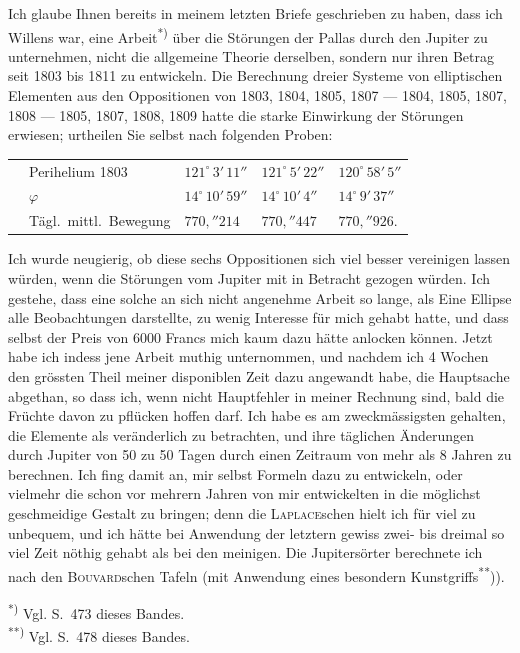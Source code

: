 \documentclass[12pt,a4paper]{article}
\begin{document}
Ich glaube Ihnen bereits in meinem letzten Briefe geschrieben zu haben, dass ich Willens war, eine Arbeit\textsuperscript{*)} über die Störungen der Pallas durch den Jupiter zu unternehmen, nicht die allgemeine Theorie derselben, sondern nur ihren Betrag seit 1803 bis 1811 zu entwickeln. Die Berechnung dreier Systeme von elliptischen Elementen aus den Oppositionen von 1803, 1804, 1805, 1807 --- 1804, 1805, 1807, 1808 --- 1805, 1807, 1808, 1809 hatte die starke Einwirkung der Störungen erwiesen; urtheilen Sie selbst nach folgenden Proben:
\begin{center}
\begin{tabular}{l@{\quad}l@{\quad}l@{\quad}l}
\toprule
& Perihelium 1803 & $121^\circ\,3'\,11''$ & $121^\circ\,5'\,22''$ & $120^\circ\,58'\,5''$ \\
& $\varphi$ & $14^\circ\,10'\,59''$ & $14^\circ\,10'\,4''$ & $14^\circ\,9'\,37''$ \\
& Tägl.~mittl.~Bewegung & $770{,}''214$ & $770{,}''447$ & $770{,}''926$. \\
\bottomrule
\end{tabular}
\end{center}
Ich wurde neugierig, ob diese sechs Oppositionen sich viel besser vereinigen lassen würden, wenn die Störungen vom Jupiter mit in Betracht gezogen würden. Ich gestehe, dass eine solche an sich nicht angenehme Arbeit so lange, als Eine Ellipse alle Beobachtungen darstellte, zu wenig Interesse für mich gehabt hatte, und dass selbst der Preis von 6000 Francs mich kaum dazu hätte anlocken können. Jetzt habe ich indess jene Arbeit muthig unternommen, und nachdem ich 4 Wochen den grössten Theil meiner disponiblen Zeit dazu angewandt habe, die Hauptsache abgethan, so dass ich, wenn nicht Hauptfehler in meiner Rechnung sind, bald die Früchte davon zu pflücken hoffen darf. Ich habe es am zweckmässigsten gehalten, die Elemente als veränderlich zu betrachten, und ihre täglichen Änderungen durch Jupiter von 50 zu 50 Tagen durch einen Zeitraum von mehr als 8 Jahren zu berechnen. Ich fing damit an, mir selbst Formeln dazu zu entwickeln, oder vielmehr die schon vor mehrern Jahren von mir entwickelten in die möglichst geschmeidige Gestalt zu bringen; denn die \textsc{Laplace}schen hielt ich für viel zu unbequem, und ich hätte bei Anwendung der letztern gewiss zwei- bis dreimal so viel Zeit nöthig gehabt als bei den meinigen. Die Jupitersörter berechnete ich nach den \textsc{Bouvard}schen Tafeln (mit Anwendung eines besondern Kunstgriffs\textsuperscript{**})).

\smallskip\noindent\textsuperscript{*)} Vgl. S.~473 dieses Bandes.\\
\textsuperscript{**)} Vgl. S.~478 dieses Bandes.
\end{document}
